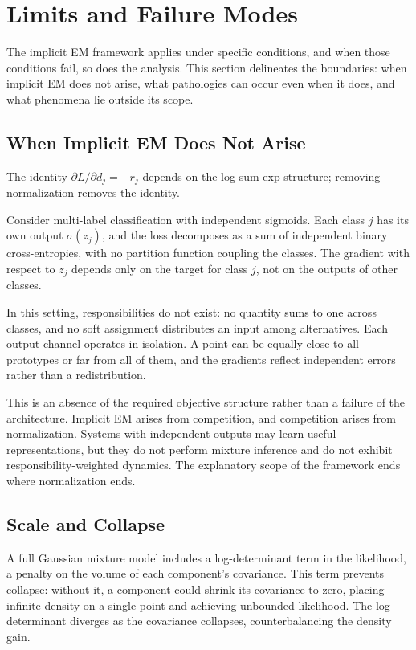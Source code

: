 \section{Limits and Failure Modes}

The implicit EM framework applies under specific conditions, and when those conditions fail, so does the analysis. This section delineates the boundaries: when implicit EM does not arise, what pathologies can occur even when it does, and what phenomena lie outside its scope.

\subsection{When Implicit EM Does Not Arise}

The identity $\partial L / \partial d_j = -r_j$ depends on the log-sum-exp structure; removing normalization removes the identity.

Consider multi-label classification with independent sigmoids. Each class $j$ has its own output $\sigma(z_j)$, and the loss decomposes as a sum of independent binary cross-entropies, with no partition function coupling the classes. The gradient with respect to $z_j$ depends only on the target for class $j$, not on the outputs of other classes.

In this setting, responsibilities do not exist: no quantity sums to one across classes, and no soft assignment distributes an input among alternatives. Each output channel operates in isolation. A point can be equally close to all prototypes or far from all of them, and the gradients reflect independent errors rather than a redistribution.

This is an absence of the required objective structure rather than a failure of the architecture. Implicit EM arises from competition, and competition arises from normalization. Systems with independent outputs may learn useful representations, but they do not perform mixture inference and do not exhibit responsibility-weighted dynamics. The explanatory scope of the framework ends where normalization ends.

\subsection{Scale and Collapse}
\label{sec:collapse}

A full Gaussian mixture model includes a log-determinant term in the likelihood, a penalty on the volume of each component's covariance. This term prevents collapse: without it, a component could shrink its covariance to zero, placing infinite density on a single point and achieving unbounded likelihood. The log-determinant diverges as the covariance collapses, counterbalancing the density gain.


